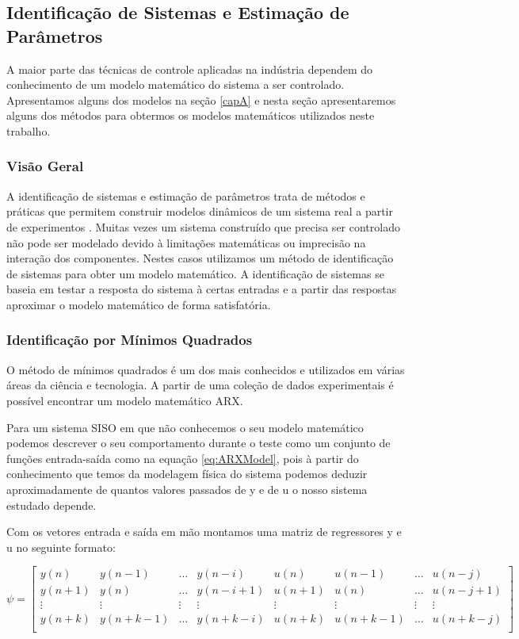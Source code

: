 \subsection{Identificação de Sistemas e Estimação de Parâmetros}
A maior parte das técnicas de controle aplicadas na indústria dependem do conhecimento de um modelo matemático do sistema a ser controlado. Apresentamos alguns dos modelos na seção \ref{capA} e nesta seção apresentaremos alguns dos métodos para obtermos os modelos matemáticos utilizados neste trabalho.


\subsubsection{Visão Geral}
A identificação de sistemas e estimação de parâmetros trata de métodos e práticas que permitem construir modelos dinâmicos de um sistema real a partir de experimentos . Muitas vezes um sistema construído que precisa ser controlado não pode ser modelado devido à limitações matemáticas ou imprecisão na interação dos componentes. Nestes casos utilizamos um método de identificação de sistemas para obter um modelo matemático. A identificação de sistemas se baseia em testar a resposta do sistema à certas entradas e a partir das respostas aproximar o modelo matemático de forma satisfatória.


\subsubsection{Identificação por Mínimos Quadrados}
O método de mínimos quadrados é um dos mais conhecidos e utilizados em várias áreas da ciência e tecnologia. A partir de uma coleção de dados experimentais é possível encontrar um modelo matemático ARX.


Para um sistema SISO em que não conhecemos o seu modelo matemático podemos descrever o seu comportamento durante o teste como um conjunto de funções entrada-saída como na equação \eqref{eq:ARXModel}, pois à partir do conhecimento que temos da modelagem física do sistema podemos deduzir aproximadamente de quantos valores passados de y e de u o nosso sistema estudado depende.


Com os vetores entrada e saída em mão montamos uma matriz de regressores y e u no seguinte formato:

\begin{equation}\label{eq:regressores}
\psi=
\begin{bmatrix}
y(n) & y(n-1) & \dots & y(n-i) & u(n) & u(n-1) & \dots & u(n-j)\\
y(n+1) & y(n) & \dots & y(n-i+1) & u(n+1) & u(n) & \dots & u(n-j+1)\\
\vdots & \vdots & \vdots & \vdots & \vdots & \vdots & \vdots  & \vdots\\
y(n+k) & y(n+k-1) & \dots & y(n+k-i) & u(n+k) & u(n+k-1) & \dots & u(n+k-j)\\
\end{bmatrix}
\end{equation}

